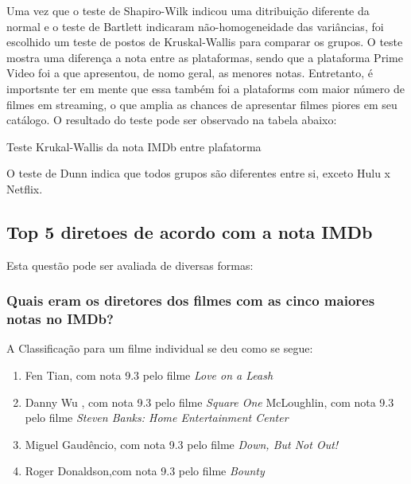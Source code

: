 \documentclass[a4paper, 12pt]{article} %
\begin{document}
Uma vez que o teste de Shapiro-Wilk indicou uma ditribuição diferente da normal e o teste de Bartlett indicaram não-homogeneidade das variâncias, foi escolhido um teste de postos de Kruskal-Wallis para comparar os grupos. O teste mostra uma diferença a nota entre as plataformas, sendo que a plataforma Prime Video foi a que apresentou, de nomo geral, as menores notas. Entretanto, é importsnte ter em mente que essa também foi a plataforms com maior número de filmes em streaming, o que amplia as chances de apresentar filmes piores em seu catálogo. O resultado do teste pode ser observado na tabela abaixo:


\begin{quadro}[H]
\centering
\caption{Teste Krukal-Wallis da nota IMDb entre plafatorma }
\label{R-Q-Teste-1}
\vspace{0.1cm}
\end{quadro}

O teste de Dunn indica que todos grupos são diferentes entre si, exceto Hulu x Netflix.

\subsection {Top 5 diretoes de acordo com a nota IMDb}

Esta questão pode ser avaliada de diversas formas:

\subsubsection{Quais eram os diretores dos filmes com as cinco maiores notas no IMDb?}

A Classificação para um filme individual se deu como se segue:\\

\begin{enumerate}[topsep=0pt,partopsep=0pt]
\item Fen Tian, com nota 9.3 pelo filme \emph{ Love on a Leash}
\item Danny Wu , com nota 9.3  pelo filme \emph{Square One}  
\itemTom McLoughlin, com nota  9.3 pelo filme \emph{Steven Banks: Home Entertainment Center}
\item Miguel Gaudêncio, com nota  9.3 pelo filme \emph{Down, But Not Out!}            
\item Roger Donaldson,com nota  9.3 pelo filme \emph{Bounty}      
\end{enumerate}
\end{document}

